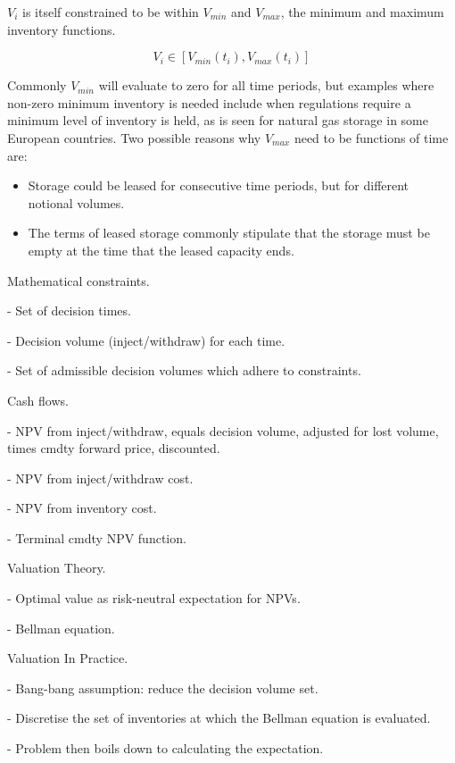\documentclass{article}
\begin{document}
$V_i$ is itself constrained to be within $V_{min}$ and $V_{max}$, the minimum and maximum
inventory functions.

\begin{equation}
    V_i \in [V_{min}(t_i), V_{max}(t_i)]
\end{equation}

Commonly $V_{min}$ will evaluate to zero for all time periods, but examples
where non-zero minimum inventory is needed include when regulations require a minimum
level of inventory is held, as is seen for natural gas storage in some European countries.
Two possible reasons why $V_{max}$ need to be functions of time are:
\begin{itemize}
    \item Storage could be leased for consecutive time periods, but for different notional
    volumes.
    \item The terms of leased storage commonly stipulate that the storage must be empty
    at the time that the leased capacity ends.
\end{itemize}


Mathematical constraints.

- Set of decision times.

- Decision volume (inject/withdraw) for each time.

- Set of admissible decision volumes which adhere to constraints.



\bigskip

Cash flows.

- NPV from inject/withdraw, equals decision volume, adjusted for lost volume,
times cmdty forward price, discounted.

- NPV from inject/withdraw cost.

- NPV from inventory cost.

- Terminal cmdty NPV function.

\bigskip

Valuation Theory.

- Optimal value as risk-neutral expectation for NPVs.

- Bellman equation.

\bigskip

Valuation In Practice.

- Bang-bang assumption: reduce the decision volume set.

- Discretise the set of inventories at which the Bellman equation is evaluated.

- Problem then boils down to calculating the expectation.
\end{document}
